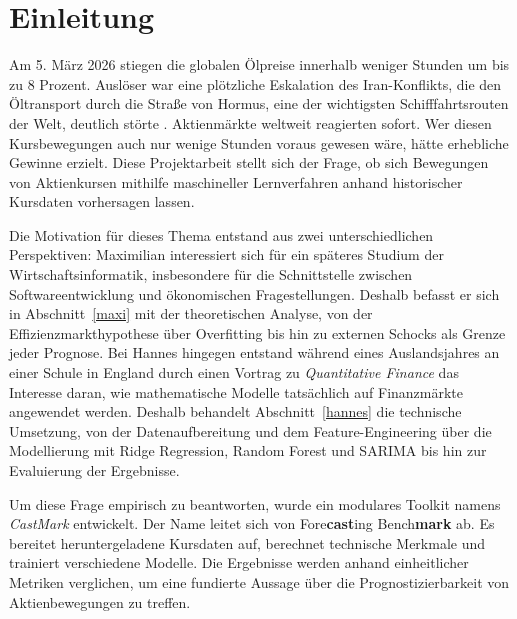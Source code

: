 \documentclass[12pt]{article}
\begin{document}
\singlespacing %


\clearpage
{}
\tableofcontents
\clearpage

\onehalfspacing %
\section{Einleitung}
Am 5. März 2026 stiegen die globalen Ölpreise innerhalb weniger Stunden um bis zu 8 Prozent. Auslöser war eine plötzliche Eskalation des Iran-Konflikts, die den Öltransport durch die Straße von Hormus, eine der wichtigsten Schifffahrtsrouten der Welt, deutlich störte 
\cite{Reuters}. Aktienmärkte weltweit reagierten sofort. Wer diesen Kursbewegungen auch nur wenige Stunden voraus gewesen wäre, hätte erhebliche Gewinne erzielt. Diese Projektarbeit stellt sich der Frage, ob sich Bewegungen von Aktienkursen mithilfe maschineller Lernverfahren anhand historischer Kursdaten vorhersagen lassen.

Die Motivation für dieses Thema entstand aus zwei unterschiedlichen Perspektiven:\newline
Maximilian interessiert sich für ein späteres Studium der Wirtschaftsinformatik, insbesondere für die Schnittstelle zwischen Softwareentwicklung und ökonomischen Fragestellungen. Deshalb befasst er sich in Abschnitt~\ref{maxi} mit der theoretischen Analyse, von der Effizienzmarkthypothese über Overfitting bis hin zu externen Schocks als Grenze jeder Prognose.\newline
Bei Hannes hingegen entstand während eines Auslandsjahres an einer Schule in England durch einen Vortrag zu \textit{Quantitative Finance} das Interesse daran, wie mathematische Modelle tatsächlich auf Finanzmärkte angewendet werden. Deshalb behandelt Abschnitt~\ref{hannes} die technische Umsetzung, von der Datenaufbereitung und dem Feature-Engineering über die Modellierung mit Ridge Regression, Random Forest und SARIMA bis hin zur Evaluierung der Ergebnisse.

Um diese Frage empirisch zu beantworten, wurde ein modulares Toolkit namens \textit{CastMark} entwickelt. Der Name leitet sich von Fore\textbf{cast}ing Bench\textbf{mark} ab. Es bereitet heruntergeladene Kursdaten auf, berechnet technische Merkmale und trainiert verschiedene Modelle. Die Ergebnisse werden anhand einheitlicher Metriken verglichen, um eine fundierte Aussage über die Prognostizierbarkeit von Aktienbewegungen zu treffen.
\end{document}
